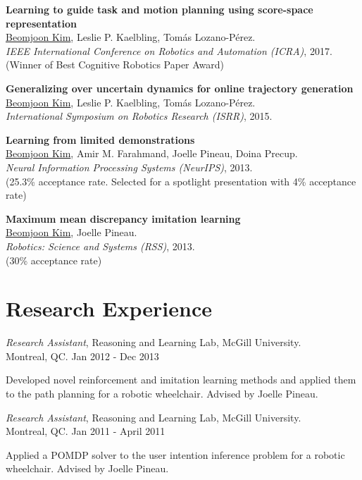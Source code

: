 \documentclass[line,margin,letterpaper]{res}
\begin{document}
\begin{resume}
\textbf{Learning to guide task and motion planning using score-space representation}\\
\underline{Beomjoon Kim}, Leslie P. Kaelbling, Tom\'as Lozano-P\'erez.\\
{\sl IEEE International Conference on Robotics and Automation (ICRA)}, 2017.\\
{\small({\color{red}Winner of Best Cognitive Robotics Paper Award})}


\textbf{Generalizing over uncertain dynamics for online trajectory generation}\\
\underline{Beomjoon Kim}, Leslie P. Kaelbling, Tom\'as Lozano-P\'erez.\\
{\sl International Symposium on Robotics Research (ISRR)}, 2015.

\textbf{Learning from limited demonstrations}\\
\underline{Beomjoon Kim}, Amir M. Farahmand, Joelle Pineau, Doina Precup.\\
{\sl Neural Information Processing Systems (NeurIPS)}, 2013.\\
{\small (25.3\% acceptance rate. Selected for a spotlight presentation with 4\% acceptance rate)}

\textbf{Maximum mean discrepancy imitation learning}\\
\underline{Beomjoon Kim}, Joelle Pineau.\\
{\sl  Robotics: Science and Systems (RSS)}, 2013.\\
{\small (30\% acceptance rate)}

\section{Research Experience}


{\sl Research Assistant}, Reasoning and Learning Lab, McGill University.
\\ \hfill Montreal, QC. Jan 2012 - Dec 2013
\begin{list}{}
\item Developed novel reinforcement and imitation learning methods and applied them to the path planning for a robotic wheelchair. Advised by Joelle Pineau.
\end{list}

{\sl Research Assistant}, Reasoning and Learning Lab, McGill University.
\\ \hfill Montreal, QC. Jan 2011 - April 2011
\begin{list}{}
\item Applied a POMDP solver to the user intention inference problem for a robotic wheelchair. Advised by Joelle Pineau.
\end{list}


\end{resume}
\end{document}
